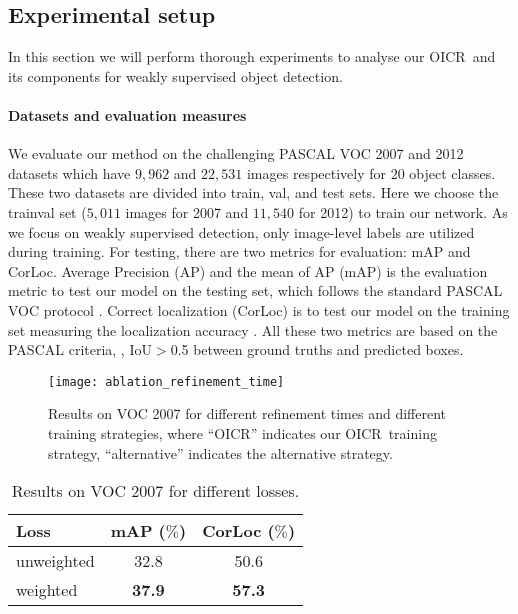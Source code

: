 \documentclass[10pt,twocolumn,letterpaper]{article}
\def\methodname{OICR}
\begin{document}
\subsection{Experimental setup}
\label{sec:exp_setup}

In this section we will perform thorough experiments to analyse our \methodname\ and its components for weakly supervised object detection.

\paragraph{Datasets and evaluation measures}
We evaluate our method on the challenging PASCAL VOC 2007 and 2012 datasets \cite{Ref:Everingham2010} which have $9,962$ and $22,531$ images respectively for $20$ object classes.
These two datasets are divided into train, val, and test sets.
Here we choose the trainval set ($5,011$ images for 2007 and $11,540$ for 2012) to train our network.
As we focus on weakly supervised detection, only image-level labels are utilized during training.
For testing, there are two metrics for evaluation: mAP and CorLoc.
Average Precision (AP) and the mean of AP (mAP) is the evaluation metric to test our model on the testing set, which follows the standard PASCAL VOC protocol \cite{Ref:Everingham2010}.
Correct localization (CorLoc) is to test our model on the training set measuring the localization accuracy \cite{Ref:Deselaers2012}.
All these two metrics are based on the PASCAL criteria, \ie, IoU$>$0.5 between ground truths and predicted boxes.


\begin{figure}[t]
\begin{center}
   \texttt{[image: ablation\_refinement\_time]}
\end{center}
   \caption{Results on VOC 2007 for different refinement times and different training strategies, where ``\methodname'' indicates our \methodname\ training strategy, ``alternative'' indicates the alternative strategy.}
\label{fig:ablation_refinement_time}
\end{figure}

\begin{table}[t]
\begin{center}
\footnotesize
\begin{tabular}{|l|c|c|}
   \hline
   Loss & mAP ($\%$) & CorLoc ($\%$) \\
   \hline\hline
   unweighted & 32.8 & 50.6 \\
   weighted & \bf{37.9} & \bf{57.3} \\
   \hline
\end{tabular}
\end{center}
\caption{Results on VOC 2007 for different losses.}
\label{table:weight}
\end{table}
\end{document}
